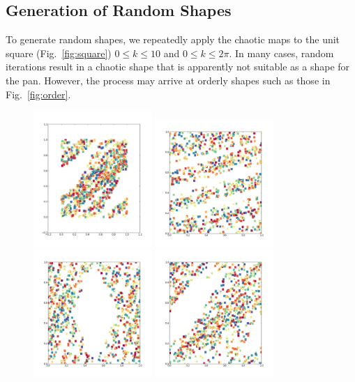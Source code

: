 \documentclass[12pt]{reedmcm}
\begin{document}
\subsection{Generation of Random Shapes}
To generate random shapes, we repeatedly apply the chaotic maps to the unit square (Fig.~\ref{fig:square}) $0 \leq k \leq 10$ and $0 \leq k \leq 2\pi$.
In many cases, random iterations result in a chaotic shape that is apparently not suitable as a shape for the pan. 
However, the process may arrive at orderly shapes such as those in Fig.~\ref{fig:order}.
\begin{figure}[h!]
  \centering
  \includegraphics[width=0.4\textwidth]{random2}
  \includegraphics[width=0.4\textwidth]{random128}
  \includegraphics[width=0.4\textwidth]{random256}
  \includegraphics[width=0.4\textwidth]{random1280}

\end{figure}
\end{document}
